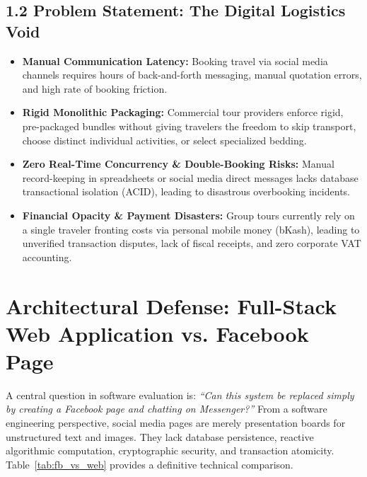 \documentclass[11pt,a4paper]{article}
\begin{document}
\subsection{1.2 Problem Statement: The Digital Logistics Void}
\begin{itemize}[leftmargin=*]
    \item \textbf{Manual Communication Latency:} Booking travel via social media channels requires hours of back-and-forth messaging, manual quotation errors, and high rate of booking friction.
    \item \textbf{Rigid Monolithic Packaging:} Commercial tour providers enforce rigid, pre-packaged bundles without giving travelers the freedom to skip transport, choose distinct individual activities, or select specialized bedding.
    \item \textbf{Zero Real-Time Concurrency \& Double-Booking Risks:} Manual record-keeping in spreadsheets or social media direct messages lacks database transactional isolation (ACID), leading to disastrous overbooking incidents.
    \item \textbf{Financial Opacity \& Payment Disasters:} Group tours currently rely on a single traveler fronting costs via personal mobile money (bKash), leading to unverified transaction disputes, lack of fiscal receipts, and zero corporate VAT accounting.
\end{itemize}

\section{Architectural Defense: Full-Stack Web Application vs. Facebook Page}

A central question in software evaluation is: \textit{``Can this system be replaced simply by creating a Facebook page and chatting on Messenger?''} From a software engineering perspective, social media pages are merely presentation boards for unstructured text and images. They lack database persistence, reactive algorithmic computation, cryptographic security, and transaction atomicity. Table~\ref{tab:fb_vs_web} provides a definitive technical comparison.
\end{document}
